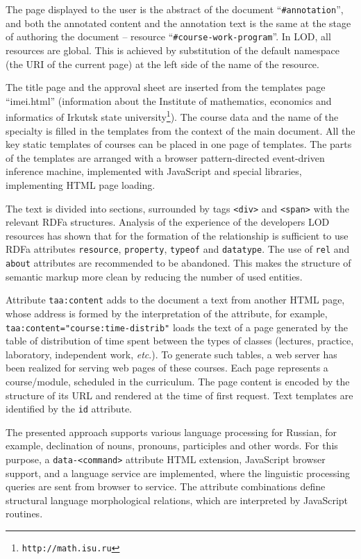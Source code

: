\documentclass[conference,a4paper]{IEEEtran}
\providecommand\url[1]{\texttt{#1}}
\begin{document}
The page displayed to the user is the abstract of the document ``\texttt{\#annotation}'', and both the annotated content and the annotation text is the same at the stage of authoring the document -- resource ``\texttt{\#course-work-program}''.  In LOD, all resources are global.  This is achieved by substitution of the default namespace (the URI of the current page) at the left side of the name of the resource.

The title page and the approval sheet are inserted from the templates page ``imei.html'' (information about the Institute of mathematics, economics and informatics of Irkutsk state university\footnote{\url{http://math.isu.ru}}).  The course data and the name of the specialty is filled in the templates from the context of the main document.  All the key static templates of courses can be placed in one page of templates.  The parts of the templates are arranged with a browser pattern-directed event-driven inference machine, implemented with JavaScript and special libraries, implementing HTML page loading.

The text is divided into sections, surrounded by tags \texttt{<div>} and \texttt{<span>} with the relevant RDFa structures.  Analysis of the experience of the developers LOD resources has shown that for the formation of the relationship is sufficient to use RDFa attributes \texttt{resource}, \texttt{property}, \texttt{typeof} and \texttt{datatype}.  The use of \texttt{rel} and \texttt{about} attributes are recommended to be abandoned.  This makes the structure of semantic markup more clean by reducing the number of used entities.

Attribute \texttt{taa:content} adds to the document a text from another HTML page, whose address is formed by the interpretation of the attribute, for example, \texttt{taa:content="course:time-distrib"} loads the text of a page generated by the table of distribution of time spent between the types of classes (lectures, practice, laboratory, independent work, \emph{etc}.).  To generate such tables, a web server has been realized for serving web pages of these courses. Each page represents a course/module, scheduled in the curriculum.  The page content is encoded by the structure of its URL and rendered at the time of first request.  Text templates are identified by the \texttt{id} attribute.

The presented approach supports various language processing for Russian, for example, declination of nouns, pronouns, participles and other words.  For this purpose, a \texttt{data-<command>} attribute HTML extension, JavaScript browser support, and a language service are implemented, where the linguistic processing queries are sent from browser to  service.  The attribute combinations define structural language morphological relations, which are interpreted by JavaScript routines.
\end{document}
